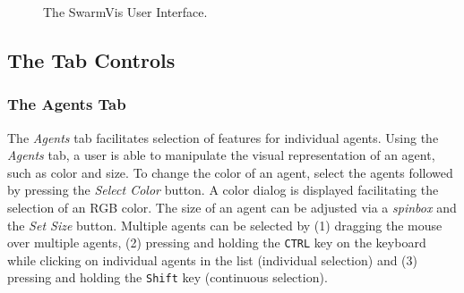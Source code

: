 \documentclass{article}
\begin{document}
\begin{figure}[htp]
     \hspace{.3in}
     
    \caption{The SwarmVis User Interface.}
     \label{interface}
\end{figure}


\subsection{The Tab Controls}

\subsubsection{The Agents Tab}
The \textit{Agents} tab facilitates selection of features for individual agents. Using the \textit{Agents} tab, a user is able to manipulate the visual representation of an agent, such as color and size. To change the color of an agent, select the agents followed by pressing the \textit{Select Color} button. A color dialog is displayed facilitating the selection of an RGB color. The size of an agent can be adjusted via a \textit{spinbox} and the \textit{Set Size} button. Multiple agents can be selected by (1) dragging the mouse over multiple agents, (2) pressing and holding the \texttt{CTRL} key on the keyboard while clicking on individual agents in the list (individual selection) and (3) pressing and holding the \texttt{Shift} key (continuous selection).
\end{document}
